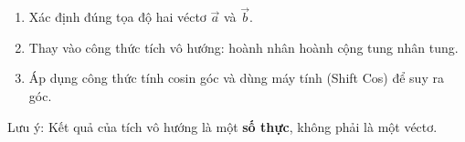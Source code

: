 \begin{enumerate}
\item Xác định đúng tọa độ hai véctơ $\overrightarrow{a}$ và $\overrightarrow{b}$.
\item Thay vào công thức tích vô hướng: hoành nhân hoành cộng tung nhân tung.
\item Áp dụng công thức tính cosin góc và dùng máy tính (Shift Cos) để suy ra góc.
\end{enumerate}
Lưu ý: Kết quả của tích vô hướng là một \textbf{số thực}, không phải là một véctơ.
